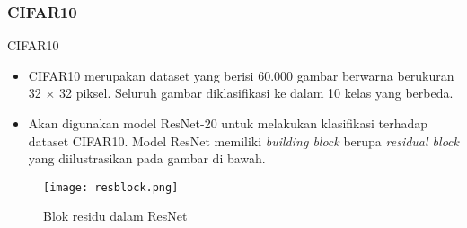 \subsubsection{CIFAR10}
\begin{frame}{CIFAR10}
  \begin{itemize}
    \item CIFAR10 \parencite{krizhevsky2009cifar} merupakan dataset yang berisi 60.000 gambar berwarna berukuran 32 $\times$ 32 piksel. Seluruh gambar diklasifikasi ke dalam 10 kelas yang berbeda.
    \item Akan digunakan model ResNet-20 \parencite{Idelbayev18a} untuk melakukan klasifikasi terhadap dataset CIFAR10. Model ResNet memiliki \textit{building block} berupa \textit{residual block} yang diilustrasikan pada gambar di bawah.
  \end{itemize}
  \begin{figure}
    \texttt{[image: resblock.png]}
    \caption{Blok residu dalam ResNet \parencite{Idelbayev18a}}
  \end{figure}
\end{frame}

